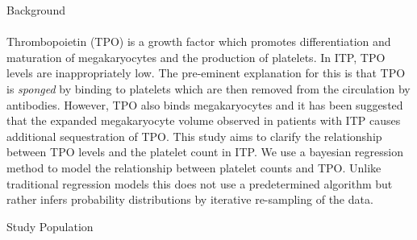 \documentclass[landscape,a0paper,fontscale=0.285]{beamer} %
\newlength{\onecolwid}
\begin{document}
\begin{frame}[t]
\begin{columns}[t]
\begin{column}{\onecolwid}
\begin{alertblock}{Background}
\paragraph{} Thrombopoietin (TPO) is a growth factor which promotes differentiation and maturation of megakaryocytes and the production of platelets\cite{NishimuraIL1ainducesthrombopoiesis2015a}.
In ITP, TPO levels are inappropriately low. The pre-eminent explanation for this is that TPO is \emph{sponged} by binding to platelets which are then removed from the circulation by antibodies\cite{Kuterreciprocalrelationshipthrombopoietin1995}. However, TPO also binds megakaryocytes and it has been suggested that the expanded megakaryocyte volume observed in patients with ITP causes additional sequestration of TPO\cite{SatoBindingregulationthrombopoietin1998}. This study aims to clarify the relationship between TPO levels and the platelet count in ITP. We use a bayesian regression method to model the relationship between platelet counts and TPO. Unlike traditional regression models this does not use a predetermined algorithm but rather infers probability distributions by iterative re-sampling of the data\cite{ChaturvediRobustBayesiananalysis1996}. 








\end{alertblock}

\begin{block}{Study Population}


\end{block}
\end{column}
\end{columns}
\end{frame}
\end{document}

